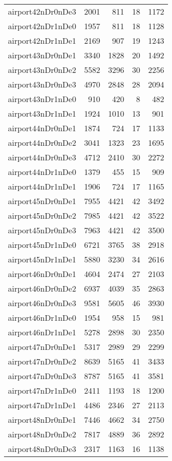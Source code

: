 \begin{longtable}{lrrrr}
airport42nDr0nDe3 & 2001 & 811 & 18 & 1172 \\
airport42nDr1nDe0 & 1957 & 811 & 18 & 1128 \\
airport42nDr1nDe1 & 2169 & 907 & 19 & 1243 \\
airport43nDr0nDe1 & 3340 & 1828 & 20 & 1492 \\
airport43nDr0nDe2 & 5582 & 3296 & 30 & 2256 \\
airport43nDr0nDe3 & 4970 & 2848 & 28 & 2094 \\
airport43nDr1nDe0 & 910 & 420 & 8 & 482 \\
airport43nDr1nDe1 & 1924 & 1010 & 13 & 901 \\
airport44nDr0nDe1 & 1874 & 724 & 17 & 1133 \\
airport44nDr0nDe2 & 3041 & 1323 & 23 & 1695 \\
airport44nDr0nDe3 & 4712 & 2410 & 30 & 2272 \\
airport44nDr1nDe0 & 1379 & 455 & 15 & 909 \\
airport44nDr1nDe1 & 1906 & 724 & 17 & 1165 \\
airport45nDr0nDe1 & 7955 & 4421 & 42 & 3492 \\
airport45nDr0nDe2 & 7985 & 4421 & 42 & 3522 \\
airport45nDr0nDe3 & 7963 & 4421 & 42 & 3500 \\
airport45nDr1nDe0 & 6721 & 3765 & 38 & 2918 \\
airport45nDr1nDe1 & 5880 & 3230 & 34 & 2616 \\
airport46nDr0nDe1 & 4604 & 2474 & 27 & 2103 \\
airport46nDr0nDe2 & 6937 & 4039 & 35 & 2863 \\
airport46nDr0nDe3 & 9581 & 5605 & 46 & 3930 \\
airport46nDr1nDe0 & 1954 & 958 & 15 & 981 \\
airport46nDr1nDe1 & 5278 & 2898 & 30 & 2350 \\
airport47nDr0nDe1 & 5317 & 2989 & 29 & 2299 \\
airport47nDr0nDe2 & 8639 & 5165 & 41 & 3433 \\
airport47nDr0nDe3 & 8787 & 5165 & 41 & 3581 \\
airport47nDr1nDe0 & 2411 & 1193 & 18 & 1200 \\
airport47nDr1nDe1 & 4486 & 2346 & 27 & 2113 \\
airport48nDr0nDe1 & 7446 & 4662 & 34 & 2750 \\
airport48nDr0nDe2 & 7817 & 4889 & 36 & 2892 \\
airport48nDr0nDe3 & 2317 & 1163 & 16 & 1138 \\

\end{longtable}
